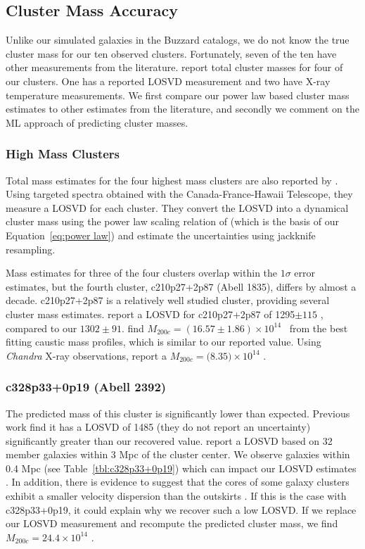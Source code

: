 \subsection{Cluster Mass Accuracy}
Unlike our simulated galaxies in the Buzzard catalogs, we do not know the true cluster mass for our ten observed clusters. Fortunately, seven of the ten have other measurements from the literature. \cite{Sifon2015} report total cluster masses for four of our clusters. One has a reported LOSVD measurement and two have X-ray temperature measurements. We first compare our power law based cluster mass estimates to other estimates from the literature, and secondly we comment on the ML approach of predicting cluster masses.

\subsubsection{High Mass Clusters}
Total mass estimates for the four highest mass clusters are also reported by \cite{Sifon2015}. Using targeted spectra obtained with the Canada-France-Hawaii Telescope, they measure a LOSVD for each cluster. They convert the LOSVD into a dynamical cluster mass using the power law scaling relation of \cite{Evrard2008} (which is the basis of our Equation~\ref{eq:power law}) and estimate the uncertainties using jackknife resampling. 

Mass estimates for three of the four clusters overlap within the $1\sigma$ error estimates, but the fourth cluster, c210p27+2p87 (Abell 1835), differs by almost a decade. c210p27+2p87 is a relatively well studied cluster, providing several cluster mass estimates. \cite{Hoekstra2012} report a LOSVD for c210p27+2p87 of 1295$\pm{115}$ \kms, compared to our $1302\pm91 $\kms. \cite{Geller2013} find $M_{200c} = (16.57\pm1.86)\times 10^{14}$ \Msol\ from the best fitting caustic mass profiles, which is similar to our reported value. Using \emph{Chandra} X-ray observations, \cite{Bonamente2012} report a $M_{200c} = (8.35$$)\times 10^{14}$ \Msol.

\subsubsection{c328p33+0p19 (Abell 2392)}
The predicted mass of this cluster is significantly lower than expected. Previous work \citep{Wing2013} find it has a LOSVD of 1485 \kms (they do not report an uncertainty) significantly greater than our recovered value. \cite{Wing2013} report a LOSVD based on 32 member galaxies within 3 Mpc of the cluster center. We observe galaxies within 0.4 Mpc (see Table~\ref{tbl:c328p33+0p19}) which can impact our LOSVD estimates . In addition, there is evidence to suggest that the cores of some galaxy clusters exhibit a smaller velocity dispersion than the outskirts . If this is the case with c328p33+0p19, it could explain why we recover such a low LOSVD. If we replace our LOSVD measurement and recompute the predicted cluster mass, we find $M_{200c} = 24.4\times10^{14}$ \Msol.

